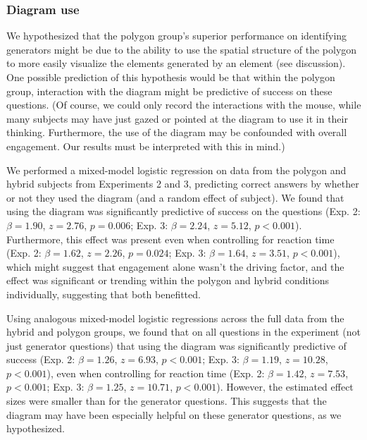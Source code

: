 \documentclass[man,10pt]{apa6}
\begin{document}
\subsubsection{Diagram use}
We hypothesized that the polygon group's superior performance on identifying generators might be due to the ability to use the spatial structure of the polygon to more easily visualize the elements generated by an element (see discussion). One possible prediction of this hypothesis would be that within the polygon group, interaction with the diagram might be predictive of success on these questions. (Of course, we could only record the interactions with the mouse, while many subjects may have just gazed or pointed at the diagram to use it in their thinking. Furthermore, the use of the diagram may be confounded with overall engagement. Our results must be interpreted with this in mind.) \par
We performed a mixed-model logistic regression on data from the polygon and hybrid subjects from Experiments 2 and 3, predicting correct answers by whether or not they used the diagram (and a random effect of subject). We found that using the diagram was significantly predictive of success on the questions (Exp. 2: $\beta=1.90$, $z = 2.76$, $p = 0.006$; Exp. 3: $\beta=2.24$, $z = 5.12$, $p < 0.001$). Furthermore, this effect was present even when controlling for reaction time (Exp. 2: $\beta = 1.62$, $z = 2.26$, $p = 0.024$; Exp. 3: $\beta = 1.64$, $z = 3.51$, $p < 0.001$), which might suggest that engagement alone wasn't the driving factor, and the effect was significant or trending within the polygon and hybrid conditions individually, suggesting that both benefitted. \par
Using analogous mixed-model logistic regressions across the full data from the hybrid and polygon groups, we found that on all questions in the experiment (not just generator questions) that using the diagram was significantly predictive of success (Exp. 2: $\beta = 1.26$, $z = 6.93$, $p < 0.001$; Exp. 3: $\beta = 1.19$, $z= 10.28$, $p < 0.001$), even when controlling for reaction time (Exp. 2: $\beta = 1.42$, $z = 7.53$, $p < 0.001$; Exp. 3: $\beta = 1.25$, $z = 10.71$, $p < 0.001$). However, the estimated effect sizes were smaller than for the generator questions. This suggests that the diagram may have been especially helpful on these generator questions, as we hypothesized. \\
\end{document}
